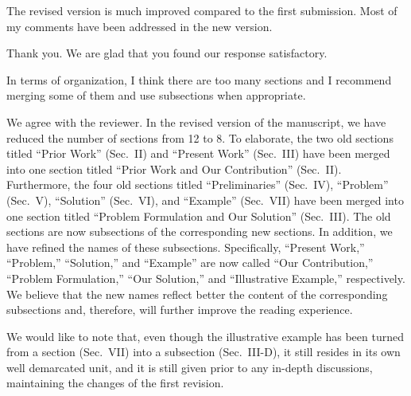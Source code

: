 \begin{reviewer}
The revised version is much improved compared to the first submission. Most of
my comments have been addressed in the new version.
\end{reviewer}

\begin{authors}
Thank you. We are glad that you found our response satisfactory.
\end{authors}

\begin{reviewer}
In terms of organization, I think there are too many sections and I recommend
merging some of them and use subsections when appropriate.
\end{reviewer}

\begin{authors}
We agree with the reviewer. In the revised version of the manuscript, we have
reduced the number of sections from 12 to 8. To elaborate, the two old sections
titled ``Prior Work'' (Sec.~II) and ``Present Work'' (Sec.~III) have been merged
into one section titled ``Prior Work and Our Contribution'' (Sec.~II).
Furthermore, the four old sections titled ``Preliminaries'' (Sec.~IV),
``Problem'' (Sec.~V), ``Solution'' (Sec.~VI), and ``Example'' (Sec.~VII) have
been merged into one section titled ``Problem Formulation and Our Solution''
(Sec.~III). The old sections are now subsections of the corresponding new
sections. In addition, we have refined the names of these subsections.
Specifically, ``Present Work,'' ``Problem,'' ``Solution,'' and ``Example'' are
now called ``Our Contribution,'' ``Problem Formulation,'' ``Our Solution,'' and
``Illustrative Example,'' respectively. We believe that the new names reflect
better the content of the corresponding subsections and, therefore, will further
improve the reading experience.

We would like to note that, even though the illustrative example has been turned
from a section (Sec.~VII) into a subsection (Sec.~III-D), it still resides in
its own well demarcated unit, and it is still given prior to any in-depth
discussions, maintaining the changes of the first revision.

\begin{actions}

\end{actions}
\end{authors}

